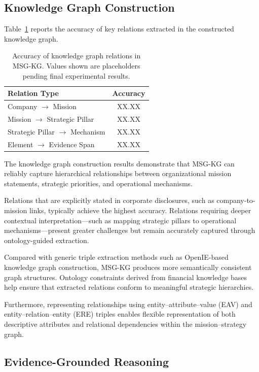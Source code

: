 \documentclass[11pt]{article}
\begin{document}
\subsection{Knowledge Graph Construction}

Table~\ref{tab:kg_results} reports the accuracy of key relations extracted in the constructed knowledge graph.

\begin{table}[h]
\centering
\caption{Accuracy of knowledge graph relations in MSG-KG. Values shown are placeholders pending final experimental results.}
\label{tab:kg_results}
\begin{tabular}{lc}
\hline
Relation Type & Accuracy \\
\hline
Company $\rightarrow$ Mission & XX.XX \\
Mission $\rightarrow$ Strategic Pillar & XX.XX \\
Strategic Pillar $\rightarrow$ Mechanism & XX.XX \\
Element $\rightarrow$ Evidence Span & XX.XX \\
\hline
\end{tabular}
\end{table}

The knowledge graph construction results demonstrate that MSG-KG can reliably capture hierarchical relationships between organizational mission statements, strategic priorities, and operational mechanisms.

Relations that are explicitly stated in corporate disclosures, such as company-to-mission links, typically achieve the highest accuracy. Relations requiring deeper contextual interpretation—such as mapping strategic pillars to operational mechanisms—present greater challenges but remain accurately captured through ontology-guided extraction.

Compared with generic triple extraction methods such as OpenIE-based knowledge graph construction, MSG-KG produces more semantically consistent graph structures. Ontology constraints derived from financial knowledge bases help ensure that extracted relations conform to meaningful strategic hierarchies.

Furthermore, representing relationships using entity--attribute--value (EAV) and entity--relation--entity (ERE) triples enables flexible representation of both descriptive attributes and relational dependencies within the mission–strategy graph.

\subsection{Evidence-Grounded Reasoning}
\end{document}
